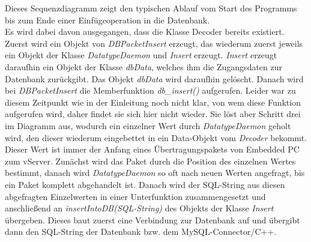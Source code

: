 \documentclass[fontsize = 12pt, paper = a4]{scrreprt}
\begin{document}
Dieses Sequenzdiagramm zeigt den typischen Ablauf vom Start des Programms bis zum Ende einer Einfügeoperation in die Datenbank.\\
Es wird dabei davon ausgegangen, dass die Klasse Decoder bereits existiert.\\
Zuerst wird ein Objekt von \textit{DBPacketInsert} erzeugt, das wiederum zuerst jeweils ein Objekt der Klasse \textit{DatatypeDaemon} und \textit{Insert} erzeugt. \textit{Insert} erzeugt daraufhin ein Objekt der Klasse \textit{dbData}, welches ihm die Zugangsdaten zur Datenbank zurückgibt. Das Objekt \textit{dbData} wird daraufhin gelöscht. Danach wird bei \textit{DBPacketInsert} die Memberfunktion \textit{db\_insert()} aufgerufen. Leider war zu diesem Zeitpunkt wie in der Einleitung noch nicht klar, von wem diese Funktion aufgerufen wird, daher findet sie sich hier nicht wieder. Sie löst aber Schritt drei im Diagramm aus, wodurch ein einzelner Wert durch \textit{DatatypeDaemon} geholt wird, den dieser wiederum eingebettet in ein Data-Objekt vom \textit{Decoder} bekommt. Dieser Wert ist immer der Anfang eines Übertragungspakets von Embedded PC zum vServer. Zunächst wird das Paket durch die Position des einzelnen Wertes bestimmt, danach wird \textit{DatatypeDaemon} so oft nach neuen Werten angefragt, bis ein Paket komplett abgehandelt ist. Danach wird der SQL-String aus diesen abgefragten Einzelwerten in einer Unterfunktion zusammengesetzt und anschließend an \textit{insertIntoDB(SQL-String)} des Objekts der Klasse \textit{Insert} übergeben. Dieses baut zuerst eine Verbindung zur Datenbank auf und übergibt dann den SQL-String der Datenbank bzw. dem MySQL-Connector/C++.


\newpage %
\end{document}
